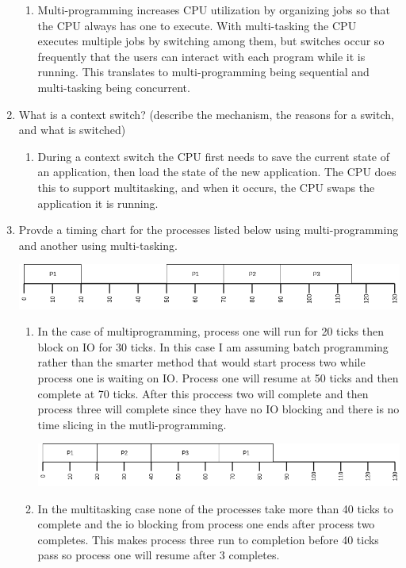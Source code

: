 \documentclass[a4paper, 11pt]{article}
\begin{document}
\begin{enumerate}
  \begin{enumerate}
    \item Multi-programming increases CPU utilization by organizing jobs so that the CPU always has one to execute. With multi-tasking the CPU executes multiple jobs by switching among them, but switches occur so frequently that the users can interact with each program while it is running. This translates to multi-programming being sequential and multi-tasking being concurrent.
  \end{enumerate}
  \item What is a context switch? (describe the mechanism, the reasons for a switch, and what is switched)
  \begin{enumerate}
    \item During a context switch the CPU first needs to save the current state of an application, then load the state of the new application. The CPU does this to support multitasking, and when it occurs, the CPU swaps the application it is running.
  \end{enumerate}
  \item Provde a timing chart for the processes listed below using multi-programming and another using multi-tasking.

  \includegraphics[width=\linewidth]{OS_HW1_1.png}
  \begin{enumerate}
    \item In the case of multiprogramming, process one will run for 20 ticks then block on IO for 30 ticks. In this case I am assuming batch programming rather than the smarter method that would start process two while process one is waiting on IO. Process one will resume at 50 ticks and then complete at 70 ticks. After this proccess two will complete and then process three will complete since they have no IO blocking and there is no time slicing in the mutli-programming.

    \includegraphics[width=\linewidth]{OS_HW1.png}
    \item In the multitasking case none of the processes take more than 40 ticks to complete and the io blocking from process one ends after process two completes. This makes process three run to completion before 40 ticks pass so process one will resume after 3 completes.
  \end{enumerate}
\end{enumerate}
\end{document}
